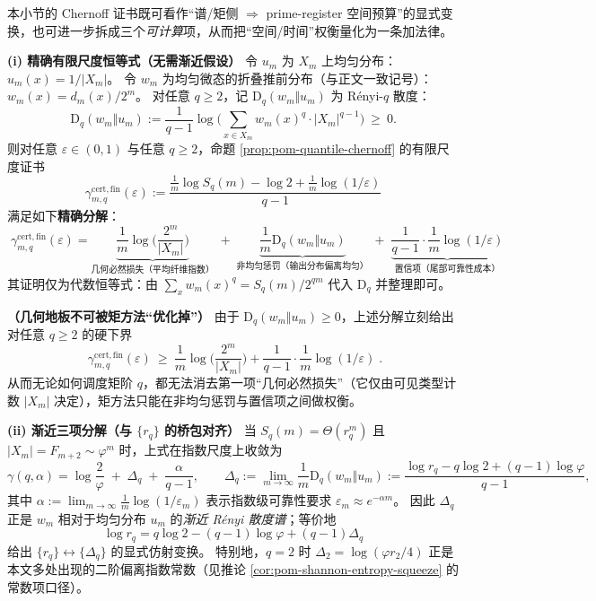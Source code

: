 \begin{remark}\label{rem:pom-quantile-budget-three-term}
本小节的 Chernoff 证书既可看作“谱/矩侧 \(\Rightarrow\) prime-register 空间预算”的显式变换，也可进一步拆成三个\emph{可计算}项，从而把“空间/时间”权衡量化为一条加法律。

\medskip\noindent\textbf{(i) 精确有限尺度恒等式（无需渐近假设）}
令 \(u_m\) 为 \(X_m\) 上均匀分布：\(u_m(x)=1/|X_m|\)。
令 \(w_m\) 为均匀微态的折叠推前分布（与正文一致记号）：
\(
w_m(x)=d_m(x)/2^m
\)。
对任意 \(q\ge 2\)，记 \(\mathrm{D}_q(w_m\Vert u_m)\) 为 R\'enyi-\(q\) 散度：
\[
\mathrm{D}_q(w_m\Vert u_m)
:=\frac{1}{q-1}\log\Big(\sum_{x\in X_m}w_m(x)^q\cdot |X_m|^{q-1}\Big)
\ \ge\ 0.
\]
则对任意 \(\varepsilon\in(0,1)\) 与任意 \(q\ge 2\)，命题 \ref{prop:pom-quantile-chernoff} 的有限尺度证书
\[
\gamma^{\mathrm{cert,fin}}_{m,q}(\varepsilon)
:=\frac{\frac{1}{m}\log S_q(m)-\log 2+\frac{1}{m}\log(1/\varepsilon)}{q-1}
\]
满足如下\textbf{精确分解}：
\[
\boxed{\;
\gamma^{\mathrm{cert,fin}}_{m,q}(\varepsilon)
=
\underbrace{\frac{1}{m}\log\Big(\frac{2^m}{|X_m|}\Big)}_{\text{几何必然损失（平均纤维指数）}}
\;+\;
\underbrace{\frac{1}{m}\mathrm{D}_q(w_m\Vert u_m)}_{\text{非均匀惩罚（输出分布偏离均匀）}}
\;+\;
\underbrace{\frac{1}{q-1}\cdot\frac{1}{m}\log(1/\varepsilon)}_{\text{置信项（尾部可靠性成本）}}
\;}
\]
其证明仅为代数恒等式：由 \(\sum_x w_m(x)^q=S_q(m)/2^{qm}\) 代入 \(\mathrm{D}_q\) 并整理即可。

\medskip\noindent\textbf{（几何地板不可被矩方法“优化掉”）}
由于 \(\mathrm{D}_q(w_m\Vert u_m)\ge 0\)，上述分解立刻给出对任意 \(q\ge 2\) 的硬下界
\[
\boxed{\;
\gamma^{\mathrm{cert,fin}}_{m,q}(\varepsilon)
\ \ge\
\frac{1}{m}\log\Big(\frac{2^m}{|X_m|}\Big)
+\frac{1}{q-1}\cdot\frac{1}{m}\log(1/\varepsilon)\; }.
\]
从而无论如何调度矩阶 \(q\)，都无法消去第一项“几何必然损失”（它仅由可见类型计数 \(|X_m|\) 决定），矩方法只能在非均匀惩罚与置信项之间做权衡。

\medskip\noindent\textbf{(ii) 渐近三项分解（与 \(\{r_q\}\) 的桥包对齐）}
当 \(S_q(m)=\Theta(r_q^m)\) 且 \(|X_m|=F_{m+2}\sim\varphi^m\) 时，上式在指数尺度上收敛为
\[
\gamma(q,\alpha)
=
\log\frac{2}{\varphi}
\;+\;
\Delta_q
\;+\;
\frac{\alpha}{q-1},
\qquad
\Delta_q:=\lim_{m\to\infty}\frac{1}{m}\mathrm{D}_q(w_m\Vert u_m)
:=\frac{\log r_q-q\log 2+(q-1)\log\varphi}{q-1},
\]
其中 \(\alpha:=\lim_{m\to\infty}\frac{1}{m}\log(1/\varepsilon_m)\) 表示指数级可靠性要求 \(\varepsilon_m\approx e^{-\alpha m}\)。
因此 \(\Delta_q\) 正是 \(w_m\) 相对于均匀分布 \(u_m\) 的\emph{渐近 R\'enyi 散度谱}；等价地
\[
\log r_q
=q\log 2-(q-1)\log\varphi+(q-1)\Delta_q
\]
给出 \(\{r_q\}\leftrightarrow\{\Delta_q\}\) 的显式仿射变换。
特别地，\(q=2\) 时
\(
\Delta_2=\log(\varphi r_2/4)
\)
正是本文多处出现的二阶偏离指数常数（见推论 \ref{cor:pom-shannon-entropy-squeeze} 的常数项口径）。
\end{remark}

